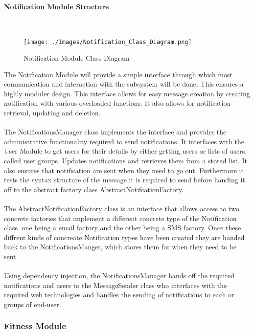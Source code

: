 \documentclass{article}
\begin{document}
			\newpage
			\paragraph	{Notification Module Structure} \mbox{} \\
			\begin{figure}[h]
				\texttt{[image: ./Images/Notification\_Class\_Diagram.png]} 
				\caption{Notification Module Class Diagram}
			\end{figure}
			
			{The Notification Module will provide a simple interface through which most communication and interaction with the subsystem will be done. This ensures a highly moduler design. This interface allows for easy message creation by creating notification with various overloaded functions. It also allows for notification retrieval, updating and deletion.\\ \\The NotificationsManager class implements the interface and provides the administrative functionality required to send notifications. It interfaces with the User Module to get users for their details by either getting users or lists of users, called user groups. Updates notifications and retrieves them from a stored list. It also ensures that notification are sent when they need to go out. Furthermore it tests the syntax structure of the message it is required to send before handing it off to the abstract factory class AbstractNotifcationFactory.\\ \\The AbstractNotificationFactory class is an interface that allows access to two concrete factories that implement a different concrete type of the Notification class. one being a email factory and the other being a SMS factory. Once these diffrent kinds of concreate Notification types have been created they are handed back to the NotificationsManger, which stores them for when they need to be sent.\\\\Using dependency injection, the NotificationsManager hands off the required notifications and users to the MessageSender class who interfaces with the required web technologies and handles the sending of notifications to each  or groups of end-user.}
		\subsubsection{Fitness Module}
\end{document}

